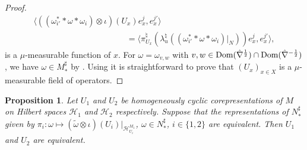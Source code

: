 \documentclass[11pt]{article}
\numberwithin{equation}{section}
\newtheorem{prop}[thm]{Proposition}
\theoremstyle{definition}
\newcommand{\cHil}{\mathcal{H}}
\newcommand{\Dom}{\text{\rm Dom}}
\begin{document}
\begin{proof}
\begin{gather*}
\langle ((\omega_{i'}^\ast \ast \omega \ast \omega_i) \otimes \iota)(U_x) e^j_x, e^{j'}_x \rangle\\
\phantom{\langle (\omega \otimes \iota)(U_x) f^{i,j}_x, f^{i',j'}_x \rangle}{} =
 \langle \pi_{U_x}^\natural(\lambda_u^\natural((\omega_{i'}^\ast \ast \omega \ast \omega_i)\vert_N))  e^j_x, e^{j'}_x \rangle,
\end{gather*}
is a $\mu$-measurable function of $x$. For $\omega = \omega_{v, w}$ with $v,w \in \Dom(\hat{\nabla}^{\frac{1}{2}}) \cap \Dom(\hat{\nabla}^{- \frac{1}{2}} )$, we have $\omega \in M_\ast^\sharp$ by \cite[Proposition~1.10]{Des}. Using \cite[Proposition~II.1.10 and~II.2.1]{DixVNA} it is straightforward to prove that $(U_x)_{x \in X}$ is a $\mu$-measurable f\/ield of operators.
\end{proof}


\begin{prop}\label{PropEqRepCorep}
 Let $U_1$ and $U_2$ be homogeneously cyclic corepresentations of $M$ on Hilbert spaces $\cHil_1$ and $\cHil_2$ respectively. Suppose that the  representations of $N_\ast^\sharp$ given by $\pi_i: \omega \mapsto (\tilde{\omega} \otimes \iota)(U_i)\vert_{\cHil_{U_i}^{M_1}}$, $\omega \in N_\ast^\sharp$, $i \in \{ 1,2\}$ are equivalent. Then $U_1$ and $U_2$ are equivalent.
\end{prop}
\end{document}

